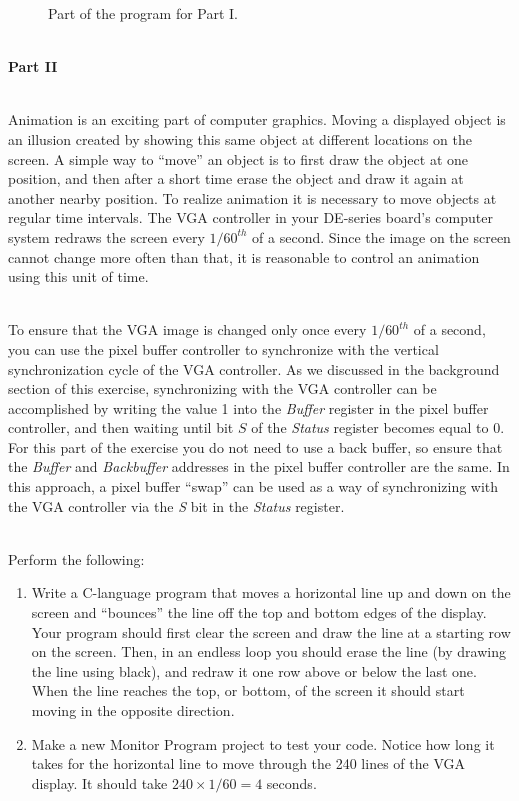 \documentclass[epsfig,10pt,fullpage]{article}
\begin{document}
\begin{figure}[H]
\centering

\caption{Part of the program for Part I.}
\label{fig:main1}
\end{figure}

~\\
\noindent
{\bf Part II}

~\\
\noindent
Animation is an exciting part of computer graphics. Moving a displayed object is an illusion 
created by showing this same object at different locations on the screen. A simple way to
``move'' an object is to first draw the object at one position, and then after a short time erase 
the object and draw it again at another nearby position. To realize animation it is necessary 
to move objects at regular time intervals. The VGA controller in your DE-series board's computer 
system redraws the screen every $1/60^{th}$ of a second. Since the image on the screen cannot 
change more often than that, it is reasonable to control an animation using this unit of time.

~\\
\noindent
To ensure that the VGA image is changed only once every $1/60^{th}$ of a second, you can use the 
pixel buffer controller to synchronize with the vertical synchronization cycle of the VGA 
controller. As we discussed in the background section of this exercise, synchronizing with the 
VGA controller can be accomplished by writing the value 1 into the {\it Buffer} register in the 
pixel buffer controller, and then waiting until bit $S$ of the {\it Status} register becomes 
equal to 0. For this part of the exercise you do not need to use a back buffer, so ensure
that the {\it Buffer} and {\it Backbuffer} addresses in the pixel buffer controller are the 
same. In this approach, a pixel buffer ``swap'' can be used as a way of synchronizing with 
the VGA controller via the {\it S} bit in the {\it Status} register.

~\\
\noindent
Perform the following:

\begin{enumerate}

\item Write a C-language program that moves a horizontal line up and down on the screen and 
``bounces'' the line off the top and bottom edges of the display. Your program should first 
clear the screen and draw the line at a starting row on the screen. Then, in an endless
loop you should erase the line (by drawing the line using black), and redraw it one row
above or below the last one.  When the line reaches the top, or bottom, of the screen 
it should start moving in the opposite direction.

\item Make a new Monitor Program project to test your code. Notice how long it takes for the 
horizontal line to move through the 240 lines of the VGA display. It should take 
$240 \times 1/60 = 4$ seconds.
\end{enumerate}
\end{document}
